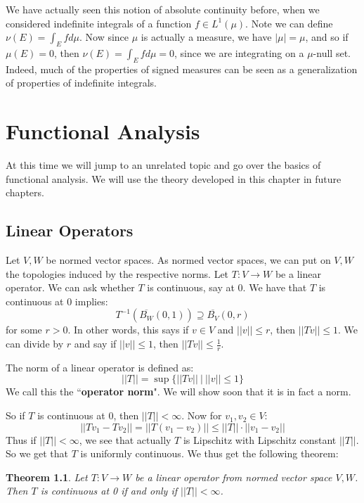 \documentclass[a4paper,12pt]{report}
\newcommand{\ovl}[1]{\overline{#1}}
\newtheorem{theorem}{Theorem}[section]
\newenvironment{definition}[1][Definition.]{\begin{trivlist}
\item[\hskip \labelsep {\bfseries #1}]}{\end{trivlist}}
\begin{document}
	\noindent We have actually seen this notion of absolute continuity before, when we considered indefinite integrals of a function $f \in L^1(\mu)$. Note we can define $\nu(E) = \int_E f d\mu$. Now since $\mu$ is actually a measure, we have $|\mu| = \mu$, and so if $\mu(E) = 0$, then $\nu(E) = \int_E f d\mu = 0$, since we are integrating on a $\mu$-null set. Indeed, much of the properties of signed measures can be seen as a generalization of properties of indefinite integrals.
	
	
	\chapter{Functional Analysis}
	At this time we will jump to an unrelated topic and go over the basics of functional analysis. We will use the theory developed in this chapter in future chapters. 
	
	\section{Linear Operators}
	
	Let $V, W$ be normed vector spaces. As normed vector spaces, we can put on $V, W$ the topologies induced by the respective norms. Let $T : V \rightarrow W$ be a linear operator. We can ask whether $T$ is continuous, say at 0. 
	We have that $T$ is continuous at 0 implies:
	\[ T^{-1}(\ovl{B_W}(0, 1)) \supseteq \ovl{B_V}(0, r) \]
	for some $r > 0$. In other words, this says if $v \in V$ and $||v|| \leq r$, then $||Tv|| \leq 1$. We can divide by $r$ and say if $||v|| \leq 1$, then $||Tv|| \leq \frac{1}{r}$. 
	
	\begin{definition}
	The norm of a linear operator is defined as:
	\[ ||T|| = \sup \bigg\{ ||Tv|| ~\big|~ ||v|| \leq 1 \bigg\} \]
	We call this the ``\textbf{operator norm}". We will show soon that it is in fact a norm. 
	\end{definition}
	
	\noindent So if $T$ is continuous at 0, then $||T|| < \infty$. Now for $v_1, v_2 \in V$:
	\[ ||Tv_1 - Tv_2|| = ||T(v_1 - v_2)|| \leq ||T|| \cdot ||v_1 - v_2|| \]
	Thus if $||T|| < \infty$, we see that actually $T$ is Lipschitz with Lipschitz constant $||T||$. So we get that $T$ is uniformly continuous. We thus get the following theorem:
	
	\begin{theorem}
	Let $T : V \rightarrow W$ be a linear operator from normed vector space $V, W$. Then $T$ is continuous at 0 if and only if $||T|| < \infty$. 
	\end{theorem}
	
\end{document}
